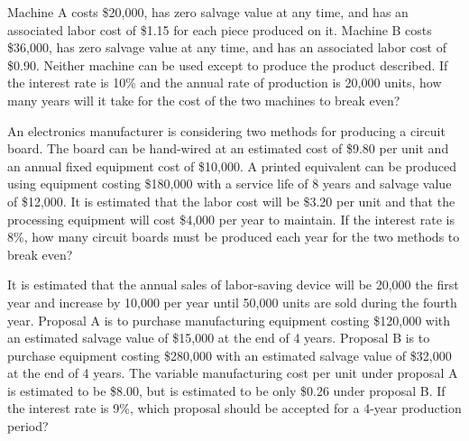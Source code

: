 \begin{exercises}
    \begin{exercise}
    \label{sea-8-22}
        Machine A costs \$20,000, has zero salvage value at any time, and has an associated labor cost of \$1.15 for each piece produced on it. Machine B costs \$36,000, has zero salvage value at any time, and has an associated labor cost of \$0.90. Neither machine can be used except to produce the product described. If the interest rate is 10\% and the annual rate of production is 20,000 units, how many years will it take for the cost of the two machines to break even?
    \end{exercise}
    \begin{solution}
    \end{solution}
    
    \begin{exercise}
    \label{sea-8-23}
        An electronics manufacturer is considering two methods for producing a circuit board. The board can be hand-wired at an estimated cost of \$9.80 per unit and an annual fixed equipment cost of \$10,000. A printed equivalent can be produced using equipment costing \$180,000 with a service life of 8 years and salvage value of \$12,000. It is estimated that the labor cost will be \$3.20 per unit and that the processing equipment will cost \$4,000 per year to maintain. If the interest rate is 8\%, how many circuit boards must be produced each year for the two methods to break even?
    \end{exercise}
    \begin{solution}
    \end{solution}
    
    \begin{exercise}
    \label{sea-8-24}
        It is estimated that the annual sales of labor-saving device will be 20,000 the first year and increase by 10,000 per year until 50,000 units are sold during the fourth year. Proposal A is to purchase manufacturing equipment costing \$120,000 with an estimated salvage value of \$15,000 at the end of 4 years. Proposal B is to purchase equipment costing \$280,000 with an estimated salvage value of \$32,000 at the end of 4 years. The variable manufacturing cost per unit under proposal A is estimated to be \$8.00, but is estimated to be only \$0.26 under proposal B. If the interest rate is 9\%, which proposal should be accepted for a 4-year production period?
    \end{exercise}
    \begin{solution}
    \end{solution}
    

\end{exercises}
